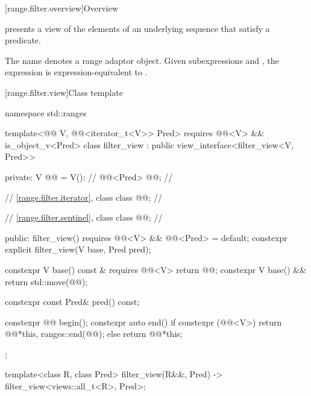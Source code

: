 [range.filter.overview]{Overview}

\pnum
{} presents a view of the elements
of an underlying sequence that satisfy a predicate.

\pnum
{}%
The name  denotes a
range adaptor object.
Given subexpressions  and ,
the expression  is expression-equivalent to
.

\pnum
\begin{example}
\end{example}

[range.filter.view]{Class template }

%
%
%
\begin{codeblock}
namespace std::ranges {
  template<@@ V, @@<iterator_t<V>> Pred>
    requires @@<V> && is_object_v<Pred>
  class filter_view : public view_interface<filter_view<V, Pred>> {
  private:
    V @@ = V();                              // \expos
    @@<Pred> @@;                    // \expos

    // \ref{range.filter.iterator}, class 
    class @@;                             // \expos

    // \ref{range.filter.sentinel}, class 
    class @@;                             // \expos

  public:
    filter_view() requires @@<V> && @@<Pred> = default;
    constexpr explicit filter_view(V base, Pred pred);

    constexpr V base() const & requires @@<V> { return @@; }
    constexpr V base() && { return std::move(@@); }

    constexpr const Pred& pred() const;

    constexpr @@ begin();
    constexpr auto end() {
      if constexpr (@@<V>)
        return @@{*this, ranges::end(@@)};
      else
        return @@{*this};
    }
  };

  template<class R, class Pred>
    filter_view(R&&, Pred) -> filter_view<views::all_t<R>, Pred>;
}
\end{codeblock}

